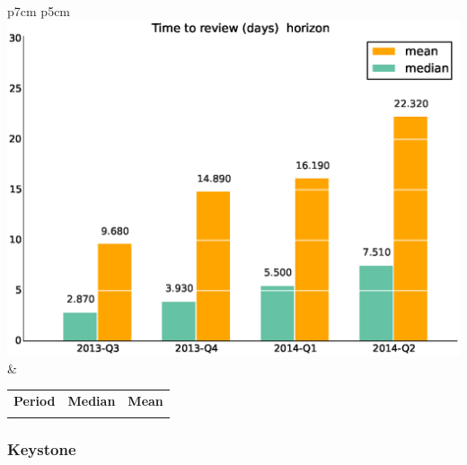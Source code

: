 \documentclass[a4wide,11pt]{report}
\begin{document}
\begin{tabular}{p{7cm} p{5cm}}
    \vspace{0pt} 
    \includegraphics[scale=.35]{figs/timetoreview_medianhorizon.eps}
    & 
    \vspace{0pt}
    \begin{tabular}{l|r|r|}%
    \bfseries Period & \bfseries Median & \bfseries Mean %
    \csvreader[head to column names]{data/timetoreview_medianhorizon.csv}{}%
    {\\ & \mediantime & \meantime}
    \end{tabular}
\end{tabular}


 \newpage 
 \subsubsection{Keystone}
\end{document}
